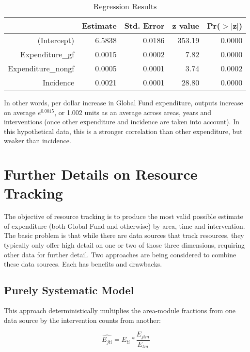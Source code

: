 \documentclass[twocolumn]{bmcart}%
\begin{document}
\begin{table}[ht]
  \caption{Regression Results}
  \label{regtable}
\centering
\begin{tabular}{rrrrr}
  \hline
 & Estimate & Std. Error & z value & Pr($>$$|$z$|$) \\
  \hline
(Intercept) & 6.5838 & 0.0186 & 353.19 & 0.0000 \\
  Expenditure\_gf & 0.0015 & 0.0002 & 7.82 & 0.0000 \\
  Expenditure\_nongf & 0.0005 & 0.0001 & 3.74 & 0.0002 \\
  Incidence & 0.0021 & 0.0001 & 28.80 & 0.0000 \\
   \hline
\end{tabular}
\end{table}

In other words, per dollar increase in Global Fund expenditure, outputs increase on average $e^{0.0015}$, or 1.002 units as an average across areas, years and interventions (once other expenditure and incidence are taken into account). In this hypothetical data, this is a stronger correlation than other expenditure, but weaker than incidence.
% 

\section{Further Details on Resource Tracking} \label{resource_tracking}

The objective of resource tracking is to produce the most valid possible estimate of expenditure (both Global Fund and otherwise) by area, time and intervention. The basic problem is that while there are data sources that track resources, they typically only offer high detail on one or two of those three dimensions, requiring other data for further detail. Two approaches are being considered to combine these data sources. Each has benefits and drawbacks.

\subsection{Purely Systematic Model}

This approach deterministically multiplies the area-module fractions from one data source by the intervention counts from another:

\begin{equation} \label{rt_model1}
\widehat{E_{jti}}=E_{ti}*\frac{E_{jtm}}{E_{tm}}
\end{equation}
\end{document}
